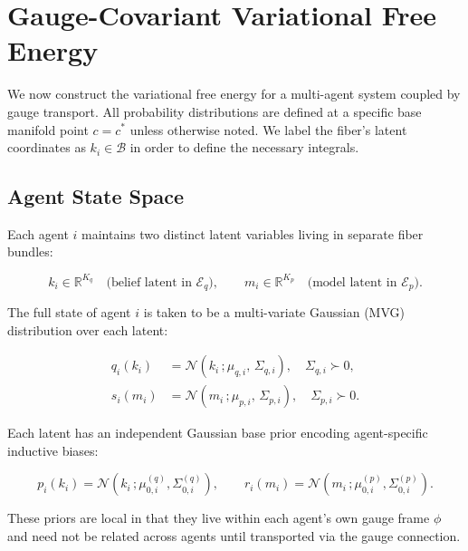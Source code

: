 \documentclass[twoside,11pt]{article}
\begin{document}
\section{Gauge-Covariant Variational Free Energy}
\label{sec:free_energy_section}

We now construct the variational free energy for a multi-agent system coupled by gauge transport. All probability distributions are defined at a specific base manifold point $c = c^*$ unless otherwise noted. We label the fiber's latent coordinates as $k_i \in \mathcal{B}$ in order to define the necessary integrals.

\subsection{Agent State Space}

Each agent $i$ maintains two distinct latent variables living in separate fiber bundles:

\begin{equation}
k_i \in \mathbb{R}^{K_q} \quad \text{(belief latent in $\mathcal{E}_q$)},
\qquad
m_i \in \mathbb{R}^{K_p} \quad \text{(model latent in $\mathcal{E}_p$)}.
\label{eq:dual_latents}
\end{equation}

The full state of agent $i$ is taken to be a multi-variate Gaussian (MVG) distribution over each latent:

\begin{equation}
\begin{aligned}
q_i(k_i) &= \mathcal{N}(k_i\,;\mu_{q,i},\,\Sigma_{q,i}),
\quad \Sigma_{q,i} \succ 0,\\
s_i(m_i) &= \mathcal{N}(m_i\,;\mu_{p,i},\,\Sigma_{p,i}),
\quad \Sigma_{p,i} \succ 0.
\end{aligned}
\label{eq:gaussian_states}
\end{equation}

Each latent has an independent Gaussian base prior encoding agent-specific inductive biases:

\begin{equation}
p_i(k_i) = \mathcal{N}(k_i\,; \mu_{0,i}^{(q)}, \Sigma_{0,i}^{(q)}),
\qquad
r_i(m_i) = \mathcal{N}(m_i\,; \mu_{0,i}^{(p)}, \Sigma_{0,i}^{(p)}).
\label{eq:base_priors}
\end{equation}

These priors are local in that they live within each agent's own gauge frame $\phi$ and need not be related across agents until transported via the gauge connection.
\end{document}
